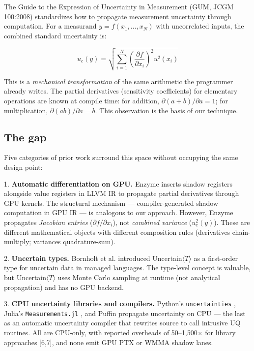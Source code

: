 \documentclass[11pt]{article}
\begin{document}
The Guide to the Expression of Uncertainty in Measurement (GUM, JCGM 100:2008) \cite{jcgm2008gum} standardizes how to propagate measurement uncertainty through computation. For a measurand $y = f(x_1, \ldots, x_N)$ with uncorrelated inputs, the combined standard uncertainty is:

\[u_c(y) = \sqrt{\sum_{i=1}^{N} \left(\frac{\partial f}{\partial x_i}\right)^2 u^2(x_i)}\]

This is a \emph{mechanical transformation} of the same arithmetic the programmer already writes. The partial derivatives (sensitivity coefficients) for elementary operations are known at compile time: for addition, $\partial(a+b)/\partial a = 1$; for multiplication, $\partial(ab)/\partial a = b$. This observation is the basis of our technique.

\subsection{The gap}

Five categories of prior work surround this space without occupying the same design point:

1. \textbf{Automatic differentiation on GPU.} Enzyme \cite{enzyme2021} inserts shadow registers alongside value registers in LLVM IR to propagate partial derivatives through GPU kernels. The structural mechanism --- compiler-generated shadow computation in GPU IR --- is analogous to our approach. However, Enzyme propagates \emph{Jacobian entries} ($\partial f/\partial x_i$), not \emph{combined variance} ($u_c^2(y)$). These are different mathematical objects with different composition rules (derivatives chain-multiply; variances quadrature-sum).

2. \textbf{Uncertain types.} Bornholt et al. \cite{uncertaint2014} introduced Uncertain$\langle T \rangle$ as a first-order type for uncertain data in managed languages. The type-level concept is valuable, but Uncertain$\langle T \rangle$ uses Monte Carlo sampling at runtime (not analytical propagation) and has no GPU backend.

3. \textbf{CPU uncertainty libraries and compilers.} Python's \texttt{uncertainties} \cite{uncertainties}, Julia's \texttt{Measurements.jl} \cite{measurementsjl}, and Puffin \cite{puffin2021} propagate uncertainty on CPU --- the last as an automatic uncertainty compiler that rewrites source to call intrusive UQ routines. All are CPU-only, with reported overheads of 50–1,500$\times$ for library approaches [6,7], and none emit GPU PTX or WMMA shadow lanes.
\end{document}
